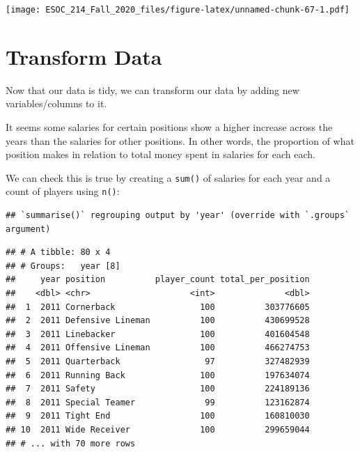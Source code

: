 \documentclass[
]{book}
\newenvironment{Shaded}{\begin{snugshade}}{\end{snugshade}}
\newcommand{\DataTypeTok}[1]{\textcolor[rgb]{0.13,0.29,0.53}{#1}}
\newcommand{\KeywordTok}[1]{\textcolor[rgb]{0.13,0.29,0.53}{\textbf{#1}}}
\newcommand{\NormalTok}[1]{#1}
\newcommand{\OperatorTok}[1]{\textcolor[rgb]{0.81,0.36,0.00}{\textbf{#1}}}
\newcommand{\StringTok}[1]{\textcolor[rgb]{0.31,0.60,0.02}{#1}}
\begin{document}
\texttt{[image: ESOC\_214\_Fall\_2020\_files/figure-latex/unnamed-chunk-67-1.pdf]}

\hypertarget{transform-data}{%
\section{Transform Data}\label{transform-data}}

Now that our data is tidy, we can transform our data by adding new variables/columns to it.

It seems some salaries for certain positions show a higher increase across the years than the salaries for other positions. In other words, the proportion of what position makes in relation to total money spent in salaries for each each.

We can check this is true by creating a \texttt{sum()} of salaries for each year and a count of players using \texttt{n()}:

\begin{Shaded}
\end{Shaded}

\begin{verbatim}
## `summarise()` regrouping output by 'year' (override with `.groups` argument)
\end{verbatim}

\begin{verbatim}
## # A tibble: 80 x 4
## # Groups:   year [8]
##     year position          player_count total_per_position
##    <dbl> <chr>                    <int>              <dbl>
##  1  2011 Cornerback                 100          303776605
##  2  2011 Defensive Lineman          100          430699528
##  3  2011 Linebacker                 100          401604548
##  4  2011 Offensive Lineman          100          466274753
##  5  2011 Quarterback                 97          327482939
##  6  2011 Running Back               100          197634074
##  7  2011 Safety                     100          224189136
##  8  2011 Special Teamer              99          123162874
##  9  2011 Tight End                  100          160810030
## 10  2011 Wide Receiver              100          299659044
## # ... with 70 more rows
\end{verbatim}
\end{document}
